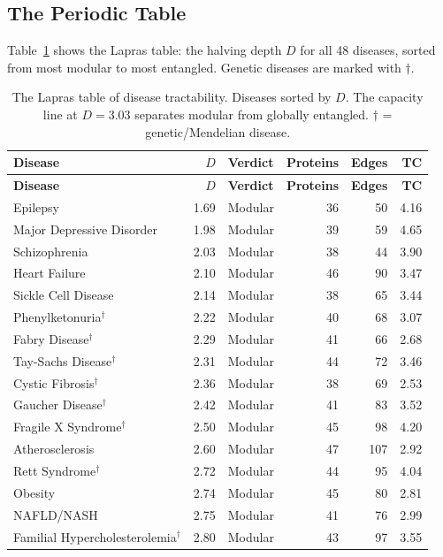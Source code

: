 \documentclass[11pt,a4paper]{article}
\begin{document}
\subsection{The Periodic Table}

Table~\ref{tab:periodic} shows the Lapras table: the halving depth $D$ for all 48 diseases, sorted from most modular to most entangled. Genetic diseases are marked with $\dagger$.

\begin{longtable}{l r l r r r}
\caption{The Lapras table of disease tractability. Diseases sorted by $D$. The capacity line at $D = 3.03$ separates modular from globally entangled. $\dagger$ = genetic/Mendelian disease.}
\label{tab:periodic} \\
\toprule
\textbf{Disease} & \textbf{$D$} & \textbf{Verdict} & \textbf{Proteins} & \textbf{Edges} & \textbf{TC} \\
\midrule
\endfirsthead
\toprule
\textbf{Disease} & \textbf{$D$} & \textbf{Verdict} & \textbf{Proteins} & \textbf{Edges} & \textbf{TC} \\
\midrule
\endhead
Epilepsy & 1.69 & Modular & 36 & 50 & 4.16 \\
Major Depressive Disorder & 1.98 & Modular & 39 & 59 & 4.65 \\
Schizophrenia & 2.03 & Modular & 38 & 44 & 3.90 \\
Heart Failure & 2.10 & Modular & 46 & 90 & 3.47 \\
Sickle Cell Disease & 2.14 & Modular & 38 & 65 & 3.44 \\
Phenylketonuria$^\dagger$ & 2.22 & Modular & 40 & 68 & 3.07 \\
Fabry Disease$^\dagger$ & 2.29 & Modular & 41 & 66 & 2.68 \\
Tay-Sachs Disease$^\dagger$ & 2.31 & Modular & 44 & 72 & 3.46 \\
Cystic Fibrosis$^\dagger$ & 2.36 & Modular & 38 & 69 & 2.53 \\
Gaucher Disease$^\dagger$ & 2.42 & Modular & 41 & 83 & 3.52 \\
Fragile X Syndrome$^\dagger$ & 2.50 & Modular & 45 & 98 & 4.20 \\
Atherosclerosis & 2.60 & Modular & 47 & 107 & 2.92 \\
Rett Syndrome$^\dagger$ & 2.72 & Modular & 44 & 95 & 4.04 \\
Obesity & 2.74 & Modular & 45 & 80 & 2.81 \\
NAFLD/NASH & 2.75 & Modular & 41 & 76 & 2.99 \\
Familial Hypercholesterolemia$^\dagger$ & 2.80 & Modular & 43 & 97 & 3.55 \\

\end{longtable}
\end{document}
